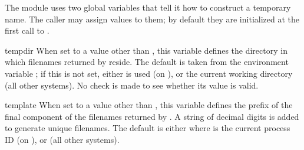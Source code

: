 The module uses two global variables that tell it how to construct a
temporary name.  The caller may assign values to them; by default they
are initialized at the first call to .

\begin{datadesc}{tempdir}
When set to a value other than , this variable defines the
directory in which filenames returned by  reside.
The default is taken from the environment variable ; if
this is not set, either  is used (on \UNIX{}), or the
current working directory (all other systems).  No check is made to
see whether its value is valid.
\end{datadesc}

\begin{datadesc}{template}
When set to a value other than , this variable defines the
prefix of the final component of the filenames returned by
.  A string of decimal digits is added to generate
unique filenames.  The default is either  where
 is the current process ID (on \UNIX{}), or  (all
other systems).
\end{datadesc}
